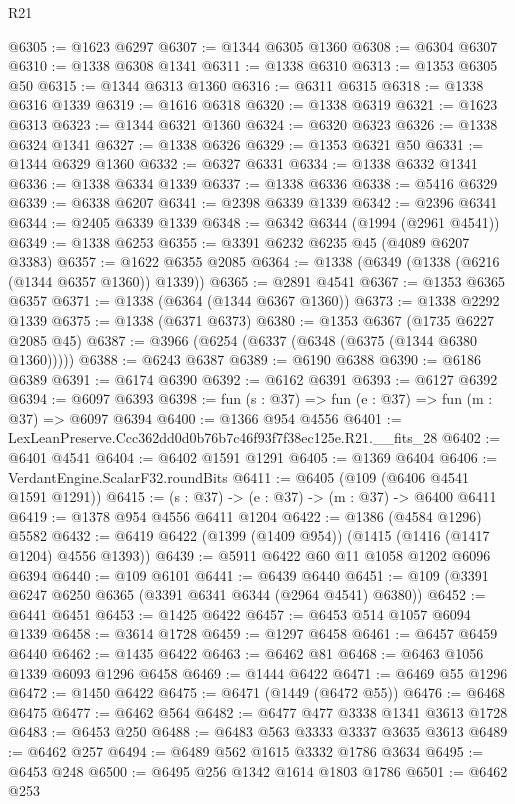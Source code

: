 \begin{lexlean}{R21}
\begin{coremodule}
@6305 := @1623 @6297
@6307 := @1344 @6305 @1360
@6308 := @6304 @6307
@6310 := @1338 @6308 @1341
@6311 := @1338 @6310
@6313 := @1353 @6305 @50
@6315 := @1344 @6313 @1360
@6316 := @6311 @6315
@6318 := @1338 @6316 @1339
@6319 := @1616 @6318
@6320 := @1338 @6319
@6321 := @1623 @6313
@6323 := @1344 @6321 @1360
@6324 := @6320 @6323
@6326 := @1338 @6324 @1341
@6327 := @1338 @6326
@6329 := @1353 @6321 @50
@6331 := @1344 @6329 @1360
@6332 := @6327 @6331
@6334 := @1338 @6332 @1341
@6336 := @1338 @6334 @1339
@6337 := @1338 @6336
@6338 := @5416 @6329
@6339 := @6338 @6207
@6341 := @2398 @6339 @1339
@6342 := @2396 @6341
@6344 := @2405 @6339 @1339
@6348 := @6342 @6344 (@1994 (@2961 @4541))
@6349 := @1338 @6253
@6355 := @3391 @6232 @6235 @45 (@4089 @6207 @3383)
@6357 := @1622 @6355 @2085
@6364 := @1338 (@6349 (@1338 (@6216 (@1344 @6357 @1360)) @1339))
@6365 := @2891 @4541
@6367 := @1353 @6365 @6357
@6371 := @1338 (@6364 (@1344 @6367 @1360))
@6373 := @1338 @2292 @1339
@6375 := @1338 (@6371 @6373)
@6380 := @1353 @6367 (@1735 @6227 @2085 @45)
@6387 := @3966 (@6254 (@6337 (@6348 (@6375 (@1344 @6380 @1360)))))
@6388 := @6243 @6387
@6389 := @6190 @6388
@6390 := @6186 @6389
@6391 := @6174 @6390
@6392 := @6162 @6391
@6393 := @6127 @6392
@6394 := @6097 @6393
@6398 := fun (s : @37) => fun (e : @37) => fun (m : @37) => @6097 @6394
@6400 := @1366 @954 @4556
@6401 := LexLeanPreserve.Ccc362dd0d0b76b7c46f93f7f38ec125e.R21.__fits_28
@6402 := @6401 @4541
@6404 := @6402 @1591 @1291
@6405 := @1369 @6404
@6406 := VerdantEngine.ScalarF32.roundBits
@6411 := @6405 (@109 (@6406 @4541 @1591 @1291))
@6415 := (s : @37) -> (e : @37) -> (m : @37) -> @6400 @6411
@6419 := @1378 @954 @4556 @6411 @1204
@6422 := @1386 (@4584 @1296) @5582
@6432 := @6419 @6422 (@1399 (@1409 @954)) (@1415 (@1416 (@1417 @1204) @4556 @1393))
@6439 := @5911 @6422 @60 @11 @1058 @1202 @6096 @6394
@6440 := @109 @6101
@6441 := @6439 @6440
@6451 := @109 (@3391 @6247 @6250 @6365 (@3391 @6341 @6344 (@2964 @4541) @6380))
@6452 := @6441 @6451
@6453 := @1425 @6422
@6457 := @6453 @514 @1057 @6094 @1339
@6458 := @3614 @1728
@6459 := @1297 @6458
@6461 := @6457 @6459 @6440
@6462 := @1435 @6422
@6463 := @6462 @81
@6468 := @6463 @1056 @1339 @6093 @1296 @6458
@6469 := @1444 @6422
@6471 := @6469 @55 @1296
@6472 := @1450 @6422
@6475 := @6471 (@1449 (@6472 @55))
@6476 := @6468 @6475
@6477 := @6462 @564
@6482 := @6477 @477 @3338 @1341 @3613 @1728
@6483 := @6453 @250
@6488 := @6483 @563 @3333 @3337 @3635 @3613
@6489 := @6462 @257
@6494 := @6489 @562 @1615 @3332 @1786 @3634
@6495 := @6453 @248
@6500 := @6495 @256 @1342 @1614 @1803 @1786
@6501 := @6462 @253

\end{coremodule}
\end{lexlean}
